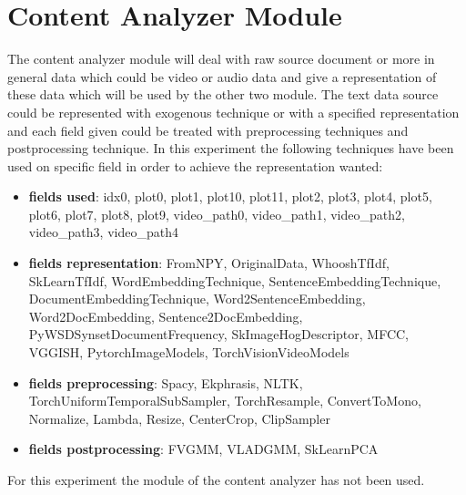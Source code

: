

\section{Content Analyzer Module}\label{sec:ca}
The content analyzer module will deal with raw source document or more in general data which could be
video or audio data and give a representation of these data which will be used by the other two module.
The text data source could be represented with exogenous technique or with a specified representation
and each field given could be treated with preprocessing techniques and postprocessing technique.
In this experiment the following techniques have been used on specific field in order to achieve the
representation wanted:
\hfill\break
\hfill\break


\begin{itemize}
    \item \textbf{fields used}:  idx0, plot0, plot1, plot10, plot11, plot2, plot3, plot4, plot5, plot6, plot7, plot8, plot9, video\_path0, video\_path1, video\_path2, video\_path3, video\_path4

    \item \textbf{fields representation}:  FromNPY, OriginalData, WhooshTfIdf, SkLearnTfIdf, WordEmbeddingTechnique, SentenceEmbeddingTechnique, DocumentEmbeddingTechnique, Word2SentenceEmbedding, Word2DocEmbedding, Sentence2DocEmbedding, PyWSDSynsetDocumentFrequency, SkImageHogDescriptor, MFCC, VGGISH, PytorchImageModels, TorchVisionVideoModels

    \item \textbf{fields preprocessing}:  Spacy, Ekphrasis, NLTK, TorchUniformTemporalSubSampler, TorchResample, ConvertToMono, Normalize, Lambda, Resize, CenterCrop, ClipSampler

    \item \textbf{fields postprocessing}:  FVGMM, VLADGMM, SkLearnPCA
\end{itemize}


For this experiment the module of the content analyzer has not been used.
\hfill\break
\hfill\break



